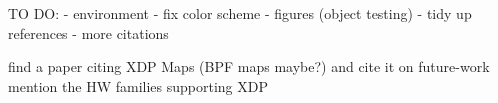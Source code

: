 TO DO:
- environment
- fix color scheme
- figures (object testing)
- tidy up references
- more citations

find a paper citing XDP Maps (BPF maps maybe?) and cite it on future-work
mention the HW families supporting XDP